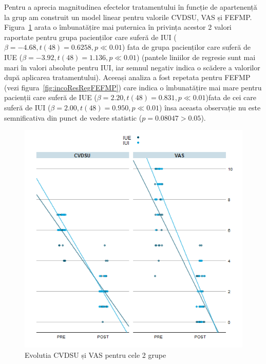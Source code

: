 \documentclass[12pt]{article}
\begin{document}
Pentru a aprecia magnitudinea efectelor tratamentului în funcție de apartenență la grup am construit un model linear pentru valorile \ac{CVDSU}, \ac{VAS} și \ac{FEFMP}. Figura~\ref{fig:incoResRegGrp} arata o îmbunatățire mai puternica în privința acestor 2 valori raportate pentru grupa pacienților care suferă de \ac{IUI} ($\beta=-4.68, t(48)=0.6258, p\ll0.01$) fata de grupa pacienților care suferă de \ac{IUE} ($\beta=-3.92, t(48)=1.136, p\ll0.01$) (pantele liniilor de regresie sunt mai mari în valori absolute pentru \ac{IUI}, iar semnul negativ indica o scădere a valorilor după aplicarea tratamentului). Aceeași analiza a fost repetata pentru \ac{FEFMP} (vezi figura~\ref{fig:incoResRegFEFMP}) care indica o îmbunatățire mai mare pentru pacienții care suferă de \ac{IUE} ($\beta=2.20, t(48)=0.831, p\ll0.01$)fata de cei care suferă de \ac{IUI} ($\beta=2.00, t(48)=0.950, p\ll0.01$) însa aceasta observație nu este semnificativa din punct de vedere statistic ($p=0.08047>0.05$).
  \begin{figure}[H]
    \centering
    \includegraphics[width=0.8\linewidth]{incoResRegGrp}
    \caption{Evolutia \acf{CVDSU} și \acf{VAS} pentru cele 2 grupe}
    \label{fig:incoResRegGrp}
  \end{figure}
\end{document}
